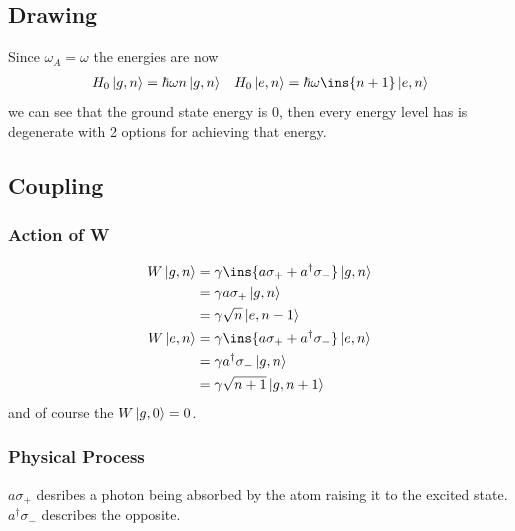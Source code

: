 \subsection{Drawing}
Since $\omega_A=\omega$ the energies are now
\begin{align}
	H_0\ket{g,n} = \hbar\omega n\ket{g,n} && H_0\ket{e,n} = \hbar\omega\ins{n+1}\ket{e,n}
\end{align}
we can see that the ground state energy is $0$, then every energy level has is degenerate with 2 options for achieving that energy.
\begin{figure}[!htb]
	\centering
\end{figure}
\subsection{Coupling}
\subsubsection{Action of W}
\begin{align}
	W\ket{g,n} &= \gamma\ins{a\sigma_++a^\dagger\sigma_- }\ket{g,n}\\
	&= \gamma a\sigma_+\ket{g,n}\\
	&= \gamma \sqrt{n} \ket{e,n - 1}\\
	W\ket{e,n} &= \gamma\ins{a\sigma_++a^\dagger\sigma_- }\ket{e,n}\\
	&= \gamma a^\dagger\sigma_-\ket{g,n}\\
	&= \gamma\sqrt{n+1}\ket{g,n+1}
\end{align}
and of course the $W\ket{g,0}=0$.
\subsubsection{Physical Process}
$a\sigma_+$ desribes a photon being absorbed by the atom raising it to the excited state. $a^\dagger\sigma_-$ describes the opposite.